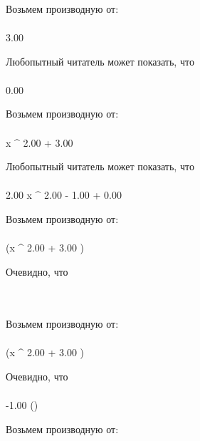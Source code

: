 Возьмем производную от:
\begin{gather}
\end{gather}
\begin{}
3.00 \\
\end{}
Любопытный читатель может показать, что
\begin{gather}
\end{gather}
\begin{}
0.00 \\
\end{}
Возьмем производную от:
\begin{gather}
\end{gather}
\begin{}
x ^ {2.00 }+ 3.00 \\
\end{}
Любопытный читатель может показать, что
\begin{gather}
\end{gather}
\begin{}
2.00  \cdot x ^ {2.00 - 1.00 }+ 0.00 \\
\end{}
Возьмем производную от:
\begin{gather}
\end{gather}
\begin{}
\ln (x ^ {2.00 }+ 3.00 )\\
\end{}
Очевидно, что
\begin{gather}
\end{gather}
\begin{}
\\
\end{}
Возьмем производную от:
\begin{gather}
\end{gather}
\begin{}
\cot \ln (x ^ {2.00 }+ 3.00 )\\
\end{}
Очевидно, что
\begin{gather}
\end{gather}
\begin{}
-1.00 \cdot ()\\
\end{}
Возьмем производную от:
\begin{gather}
\end{gather}
